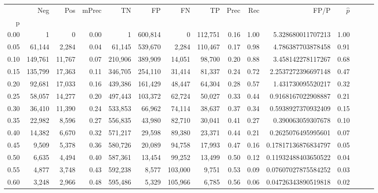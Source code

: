 \begin{tabular}{rrrrrrrrrrrrrrr}
\toprule
{} &      Neg &     Pos & mPrec &       TN &       FP &       FN &       TP &  Prec &   Rec &                    FP/P & $\hat{p}$ \\
p    &          &         &       &          &          &          &          &       &       &                         &           \\
\midrule
0.00 &        1 &       0 &  0.00 &        1 &  600,814 &        0 &  112,751 &  0.16 &  1.00 &       5.328680011707213 &      1.00 \\
0.05 &   61,144 &   2,284 &  0.04 &   61,145 &  539,670 &    2,284 &  110,467 &  0.17 &  0.98 &       4.786387703878458 &      0.91 \\
0.10 &  149,761 &  11,767 &  0.07 &  210,906 &  389,909 &   14,051 &   98,700 &  0.20 &  0.88 &       3.458142278117267 &      0.68 \\
0.15 &  135,799 &  17,363 &  0.11 &  346,705 &  254,110 &   31,414 &   81,337 &  0.24 &  0.72 &      2.2537272396697148 &      0.47 \\
0.20 &   92,681 &  17,033 &  0.16 &  439,386 &  161,429 &   48,447 &   64,304 &  0.28 &  0.57 &       1.431730095520217 &      0.32 \\
0.25 &   58,057 &  14,277 &  0.20 &  497,443 &  103,372 &   62,724 &   50,027 &  0.33 &  0.44 &      0.9168167022908887 &      0.21 \\
0.30 &   36,410 &  11,390 &  0.24 &  533,853 &   66,962 &   74,114 &   38,637 &  0.37 &  0.34 &      0.5938927370932409 &      0.15 \\
0.35 &   22,982 &   8,596 &  0.27 &  556,835 &   43,980 &   82,710 &   30,041 &  0.41 &  0.27 &       0.390063059307678 &      0.10 \\
0.40 &   14,382 &   6,670 &  0.32 &  571,217 &   29,598 &   89,380 &   23,371 &  0.44 &  0.21 &      0.2625076495995601 &      0.07 \\
0.45 &    9,509 &   5,378 &  0.36 &  580,726 &   20,089 &   94,758 &   17,993 &  0.47 &  0.16 &     0.17817136876834797 &      0.05 \\
0.50 &    6,635 &   4,494 &  0.40 &  587,361 &   13,454 &   99,252 &   13,499 &  0.50 &  0.12 &     0.11932488403650522 &      0.04 \\
0.55 &    4,877 &   3,748 &  0.43 &  592,238 &    8,577 &  103,000 &    9,751 &  0.53 &  0.09 &     0.07607027875584252 &      0.03 \\
0.60 &    3,248 &   2,966 &  0.48 &  595,486 &    5,329 &  105,966 &    6,785 &  0.56 &  0.06 &     0.04726343890519818 &      0.02 \\

\end{tabular}
